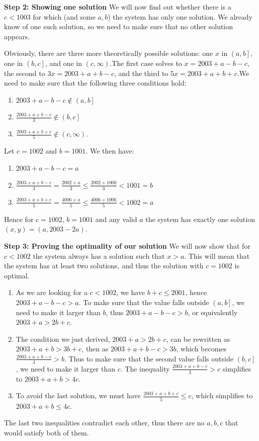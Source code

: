 \begin{enumerate}
 \textbf{Step 2: Showing one solution} We will now find out whether there is a $c<1003$ for which (and some $a,b$) the system has only one solution. We already know of one such solution, so we need to make sure that no other solution appears.

 Obviously, there are three more theoretically possible solutions: one $x$ in $\left(a,b\right]$, one in $\left(b,c\right]$, and one in $\left(c,\infty\right)$.The first case solves to $x=2003+a-b-c$, the second to $3x=2003+a+b-c$, and the third to $5x=2003+a+b+c$.We need to make sure that the following three conditions hold:

 
            \begin{enumerate}
        \item $2003+a-b-c\not\in\left(a,b\right]$
        \item $\frac{2003+a+b-c}3\not\in \left(b,c\right]$
        \item $\frac{2003+a+b+c}5\not\in\left(c,\infty\right)$.
            \end{enumerate}
            Let $c=1002$ and $b=1001$. We then have:

 
            \begin{enumerate}
        \item $2003+a-b-c=a$
        \item $\frac{2003+a+b-c}3 = \frac{2002+a}3 \leq \frac{2002+1000}3 < 1001 = b$
        \item $\frac{2003+a+b+c}5 = \frac{4006+a}5 \leq \frac{4006+1006}5 < 1002 = a$
            \end{enumerate}
            Hence for $c=1002$, $b=1001$ and any valid $a$ the system has exactly one solution $(x,y)=(a,2003-2a)$.

 \textbf{Step 3: Proving the optimality of our solution} We will now show that for $c<1002$ the system always has a solution such that $x>a$. This will mean that the system has at least two solutions, and thus the solution with $c=1002$ is optimal.

 
            \begin{enumerate}
        \item As we are looking for a $c<1002$, we have $b+c\leq 2001$, hence $2003+a-b-c > a$. To make sure that the value falls outside $\left(a,b\right]$, we need to make it larger than $b$, thus $2003+a-b-c > b$, or equivalently $2003+a > 2b+c$.
        \item The condition we just derived, $2003+a > 2b+c$, can be rewritten as $2003+a+b > 3b+c$, then as $2003+a+b-c > 3b$, which becomes $\frac{2003+a+b-c}3 > b$. Thus to make sure that the second value falls outside $\left(b,c\right]$, we need to make it larger than $c$. The inequality $\frac{2003+a+b-c}3 > c$ simplifies to $2003+a+b > 4c$.
        \item To avoid the last solution, we must have $\frac{2003+a+b+c}5\leq c$, which simplifies to $2003+a+b \leq 4c$.
            \end{enumerate}
            The last two inequalities contradict each other, thus there are no $a,b,c$ that would satisfy both of them.


\end{enumerate}
